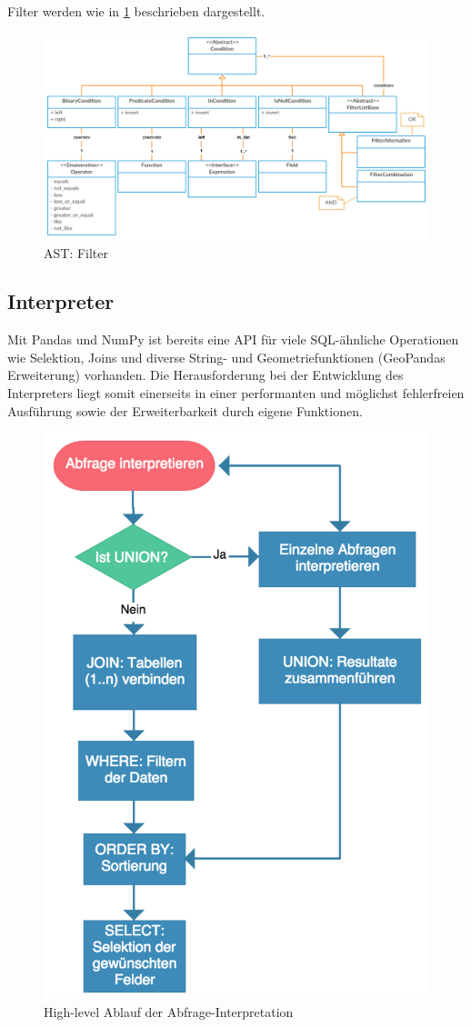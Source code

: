 Filter werden wie in \cref{fig:pd:odhql-ast-filter} beschrieben dargestellt.
\begin{figure}[H]
\centering
\includegraphics[width=0.8\linewidth]{fig/odhql-ast-filter.pdf}
\caption{AST: Filter}
\label{fig:pd:odhql-ast-filter}
\end{figure}

\subsection{Interpreter}
\xxx[fscala]
Mit Pandas und NumPy ist bereits eine API für viele SQL-ähnliche Operationen wie Selektion, Joins und diverse String- und Geometriefunktionen (GeoPandas Erweiterung) vorhanden. Die Herausforderung bei der Entwicklung des Interpreters liegt somit einerseits in einer performanten und möglichst fehlerfreien Ausführung sowie der Erweiterbarkeit durch eigene Funktionen.

\begin{figure}[H]
\centering
\includegraphics[width=0.6\linewidth]{fig/odhql-flow.pdf}
\caption{High-level Ablauf der Abfrage-Interpretation}
\label{fig:pd:odhql-flow}
\end{figure}


